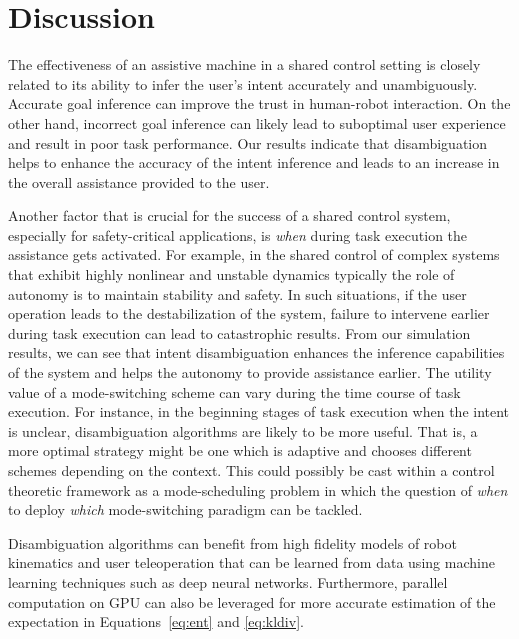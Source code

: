 \documentclass[letterpaper, 10 pt, conference]{ieeeconf}  %
\begin{document}
\section{Discussion}\label{sec:discussions}

The effectiveness of an assistive machine in a shared control setting is closely related to its ability to infer the user's intent accurately and unambiguously. Accurate goal inference can improve the trust in human-robot interaction. On the other hand, incorrect goal inference can likely lead to suboptimal user experience and result in poor task performance. Our results indicate that disambiguation helps to enhance the accuracy of the intent inference and leads to an increase in the overall assistance provided to the user. 

Another factor that is crucial for the success of a shared control system, especially for safety-critical applications, is \textit{when} during task execution the assistance gets activated. For example, in the shared control of complex systems that exhibit highly nonlinear and unstable dynamics typically the role of autonomy is to maintain stability and safety. In such situations, if the user operation leads to the destabilization of the system, failure to intervene earlier during task execution can lead to catastrophic results. From our simulation results, we can see that intent disambiguation enhances the inference capabilities of the system and helps the autonomy to provide assistance earlier.
The utility value of a mode-switching scheme can vary during the time course of task execution. For instance, in the beginning stages of task execution when the intent is unclear, disambiguation algorithms are likely to be more useful. That is, a more optimal strategy might be one which is adaptive and chooses different schemes depending on the context. This could possibly be cast within a control theoretic framework as a mode-scheduling problem in which the question of \textit{when} to deploy \textit{which} mode-switching paradigm can be tackled.

Disambiguation algorithms can benefit from high fidelity models of robot kinematics and user teleoperation that can be learned from data using machine learning techniques such as deep neural networks. Furthermore, parallel computation on GPU can also be leveraged for more accurate estimation of the expectation in Equations~\ref{eq:ent} and \ref{eq:kldiv}. 
\end{document}
